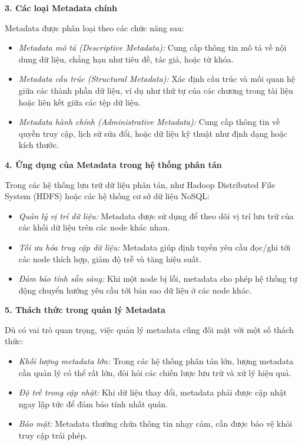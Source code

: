 \documentclass[../main.tex]{subfiles}
\begin{document}
\textbf{3. Các loại Metadata chính}  

Metadata được phân loại theo các chức năng sau:  
\begin{itemize}
    \item \textit{Metadata mô tả (Descriptive Metadata):} Cung cấp thông tin mô tả về nội dung dữ liệu, chẳng hạn như tiêu đề, tác giả, hoặc từ khóa.
    \item \textit{Metadata cấu trúc (Structural Metadata):} Xác định cấu trúc và mối quan hệ giữa các thành phần dữ liệu, ví dụ như thứ tự của các chương trong tài liệu hoặc liên kết giữa các tệp dữ liệu.
    \item \textit{Metadata hành chính (Administrative Metadata):} Cung cấp thông tin về quyền truy cập, lịch sử sửa đổi, hoặc dữ liệu kỹ thuật như định dạng hoặc kích thước.
\end{itemize}

\textbf{4. Ứng dụng của Metadata trong hệ thống phân tán}  

Trong các hệ thống lưu trữ dữ liệu phân tán, như Hadoop Distributed File System (HDFS) hoặc các hệ thống cơ sở dữ liệu NoSQL:  
\begin{itemize}
    \item \textit{Quản lý vị trí dữ liệu:} Metadata được sử dụng để theo dõi vị trí lưu trữ của các khối dữ liệu trên các node khác nhau.
    \item \textit{Tối ưu hóa truy cập dữ liệu:} Metadata giúp định tuyến yêu cầu đọc/ghi tới các node thích hợp, giảm độ trễ và tăng hiệu suất.
    \item \textit{Đảm bảo tính sẵn sàng:} Khi một node bị lỗi, metadata cho phép hệ thống tự động chuyển hướng yêu cầu tới bản sao dữ liệu ở các node khác.
\end{itemize}

\textbf{5. Thách thức trong quản lý Metadata}  

Dù có vai trò quan trọng, việc quản lý metadata cũng đối mặt với một số thách thức:  
\begin{itemize}
    \item \textit{Khối lượng metadata lớn:} Trong các hệ thống phân tán lớn, lượng metadata cần quản lý có thể rất lớn, đòi hỏi các chiến lược lưu trữ và xử lý hiệu quả.
    \item \textit{Độ trễ trong cập nhật:} Khi dữ liệu thay đổi, metadata phải được cập nhật ngay lập tức để đảm bảo tính nhất quán.
    \item \textit{Bảo mật:} Metadata thường chứa thông tin nhạy cảm, cần được bảo vệ khỏi truy cập trái phép.
\end{itemize}
\end{document}
